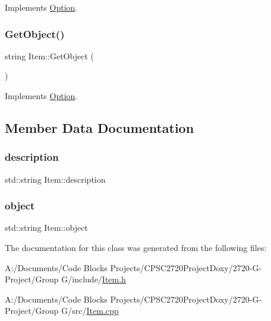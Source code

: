 Implements \mbox{\hyperlink{class_option_a5e931f580c01238769c5de228666d0a5}{Option}}.

\mbox{\label{class_item_a452e4e30bc473c454af2e635fce18db6}} 
\subsubsection{\texorpdfstring{Get\+Object()}{GetObject()}}
{\footnotesize\ttfamily string Item\+::\+Get\+Object (\begin{DoxyParamCaption}{ }\end{DoxyParamCaption})\hspace{0.3cm}{\ttfamily [virtual]}}



Implements \mbox{\hyperlink{class_option_ae87cbc4730a9b60734babe6b253fac0b}{Option}}.



\subsection{Member Data Documentation}
\mbox{\label{class_item_a7417563f4b149d5e531cea1e993f66f6}} 
\subsubsection{\texorpdfstring{description}{description}}
{\footnotesize\ttfamily std\+::string Item\+::description\hspace{0.3cm}{\ttfamily [protected]}}

\mbox{\label{class_item_ac783075d151891b9365b807e5d42b4b7}} 
\subsubsection{\texorpdfstring{object}{object}}
{\footnotesize\ttfamily std\+::string Item\+::object\hspace{0.3cm}{\ttfamily [protected]}}



The documentation for this class was generated from the following files\+:\begin{DoxyCompactItemize}
\item 
A\+:/\+Documents/\+Code Blocks Projects/\+C\+P\+S\+C2720\+Project\+Doxy/2720-\/\+G-\/\+Project/\+Group G/include/\mbox{\hyperlink{_item_8h}{Item.\+h}}\item 
A\+:/\+Documents/\+Code Blocks Projects/\+C\+P\+S\+C2720\+Project\+Doxy/2720-\/\+G-\/\+Project/\+Group G/src/\mbox{\hyperlink{_item_8cpp}{Item.\+cpp}}\end{DoxyCompactItemize}
